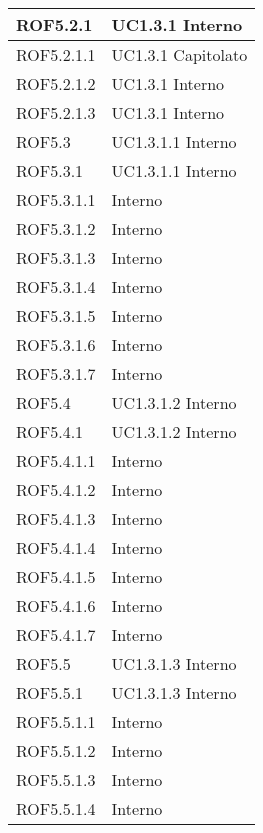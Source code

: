 \begin{center}
\begin{longtable}{| p{4cm} | p{4cm} |}
\hline
ROF5.2.1   &  UC1.3.1 \newline Interno \\
\hline
ROF5.2.1.1   &  UC1.3.1 \newline Capitolato \\
\hline
ROF5.2.1.2   &  UC1.3.1 \newline Interno \\
\hline
ROF5.2.1.3   &  UC1.3.1 \newline Interno \\
\hline
ROF5.3   &  UC1.3.1.1 \newline Interno \\
\hline
ROF5.3.1   &  UC1.3.1.1 \newline Interno \\
\hline
ROF5.3.1.1   &  Interno \\
\hline
ROF5.3.1.2   &  Interno \\
\hline
ROF5.3.1.3   &  Interno \\
\hline
ROF5.3.1.4   &  Interno \\
\hline
ROF5.3.1.5   &  Interno \\
\hline
ROF5.3.1.6   &  Interno \\
\hline
ROF5.3.1.7   &  Interno \\
\hline
ROF5.4   &  UC1.3.1.2 \newline Interno \\
\hline
ROF5.4.1   &  UC1.3.1.2 \newline Interno \\
\hline
ROF5.4.1.1   &  Interno \\
\hline
ROF5.4.1.2   &  Interno \\
\hline
ROF5.4.1.3   &  Interno \\
\hline
ROF5.4.1.4   &  Interno \\
\hline
ROF5.4.1.5   &  Interno \\
\hline
ROF5.4.1.6   &  Interno \\
\hline
ROF5.4.1.7   &  Interno \\
\hline
ROF5.5   &  UC1.3.1.3 \newline Interno \\
\hline
ROF5.5.1   &  UC1.3.1.3 \newline Interno \\
\hline
ROF5.5.1.1   &  Interno \\
\hline
ROF5.5.1.2   &  Interno \\
\hline
ROF5.5.1.3   &  Interno \\
\hline
ROF5.5.1.4   &  Interno \\

\end{longtable}
\end{center}
